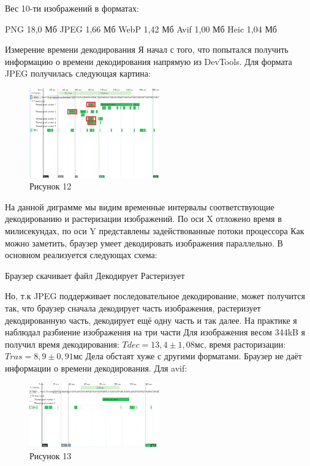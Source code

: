 \documentclass[12pt]{article}
\begin{document}
Вес 10-ти изображений в форматах:

PNG 18,0 Мб
JPEG 1,66 Мб
WebP 1,42 Мб
Avif 1,00 Мб
Heic 1,04 Мб

Измерение времени декодирования
Я начал с того, что попытался получить информацию о времени декодирования напрямую из DevTools. Для формата JPEG получилась следующая картина:
\begin{figure}[h!]
\centering
\includegraphics[width=0.5\textwidth]{../images/image_comp/devtools.png}
\caption{Рисунок 12}
\end{figure}

На данной диграмме мы видим временные интервалы соответствующие декодированию и растеризации изображений.
По оси X отложено время в милисекундах, по оси Y представлены задействованные потоки процессора
Как можно заметить, браузер умеет декодировать изображения параллельно.
В основном реализуется следующах схема:

Браузер скачивает файл
Декодирует
Растеризует

Но, т.к JPEG поддерживает последовательное декодирование, может получится так, что браузер сначала декодирует часть изображения,
растеризует декодированную часть, декодирует ещё одну часть и так далее. На практике я наблюдал разбиение изображения на три части
Для изображения весом 344kB я получил время декодирования: $T{dec}=13,4 \pm 1,08мс$, время расторизации: $T{ras}=8,9 \pm 0,91мс$
Дела обстаят хуже с другими форматами. Браузер не даёт информации о времени декодирования.
Для avif:
\begin{figure}[h!]
\centering
\includegraphics[width=0.5\textwidth]{../images/image_comp/avif_one_image.png}
\caption{Рисунок 13}
\end{figure}
\end{document}
